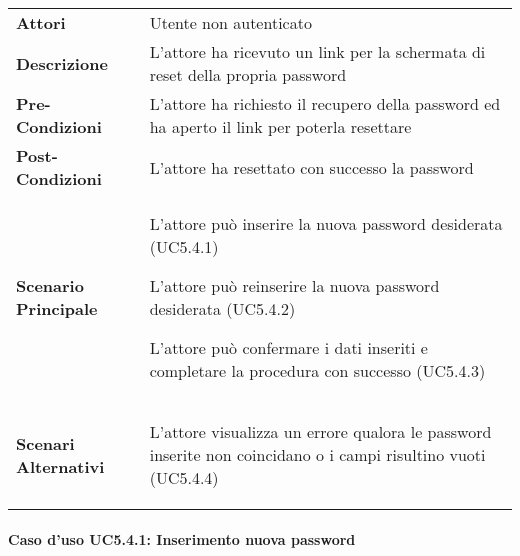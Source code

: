 \begin{minipage}{\linewidth}
	\begin{longtable}{ l | p{11cm}}
		\hline
		\rowcolor{Gray}
		\multicolumn{2}{c}{UC5.4 - Reset password} \\
		\hline
		\textbf{Attori} & Utente non autenticato \\
		\textbf{Descrizione} & L'attore ha ricevuto un link per la schermata di reset della propria password \\
		\textbf{Pre-Condizioni} & L'attore ha richiesto il recupero della password ed ha aperto il link per poterla resettare\\
		\textbf{Post-Condizioni} & L'attore ha resettato con successo la password\\
		\textbf{Scenario Principale} & \begin{enumerate*}[label=(\arabic*.),itemjoin={\newline}]
			\item L'attore può inserire la nuova password desiderata (UC5.4.1)
			\item L'attore può reinserire la nuova password desiderata (UC5.4.2)
			\item L'attore può confermare i dati inseriti e completare la procedura con successo (UC5.4.3)
		\end{enumerate*}\\
		\textbf{Scenari Alternativi} & \begin{enumerate*}[label=(\arabic*.),itemjoin={\newline}]
			\item L'attore visualizza un errore qualora le password inserite non coincidano o i campi risultino vuoti (UC5.4.4)
		\end{enumerate*}\\
	\end{longtable}
\end{minipage}

\paragraph{Caso d'uso UC5.4.1: Inserimento nuova password}
\label{UC5_4_1}

